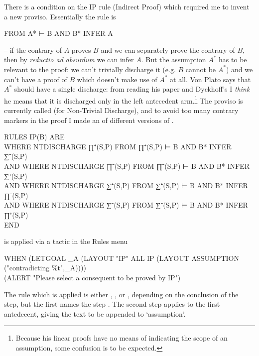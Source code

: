 There is a condition on the IP rule (Indirect Proof) which required me to invent a new proviso. Essentially the rule is
\begin{japeish}
FROM A* ⊢ B AND B* INFER A
\end{japeish}
-- if the contrary of $A$ proves $B$ and we can separately prove the contrary of $B$, then by \emph{reductio ad absurdum} we can infer $A$. But the assumption $A^{*}$ has to be relevant to the proof: we can't trivially discharge it (e.g. $B$ cannot be $A^{*}$) and we can't have a proof of $B$ which doesn't make use of $A^{*}$ at all. Von Plato says that $A^{*}$ should have a single discharge: from reading his paper and Dyckhoff's I \emph{think} he means that it is discharged only in the left antecedent arm.\footnote{Because his linear proofs have no means of indicating the scope of an assumption, some confusion is to be expected.} The proviso is currently called  (for Non-Trivial Discharge), and to avoid too many contrary markers in the proof I made an  of different versions of .
\begin{japeish}
RULES IP(B) ARE \\
\tab\tab WHERE NTDISCHARGE ∏⁺(S,P) FROM ∏⁺(S,P) ⊢ B AND B* INFER ∑⁻(S,P) \\ 
 AND WHERE NTDISCHARGE ∏⁻(S,P) FROM ∏⁻(S,P) ⊢ B AND B* INFER ∑⁺(S,P)  \\
 AND WHERE NTDISCHARGE ∑⁺(S,P) FROM ∑⁺(S,P) ⊢ B AND B* INFER ∏⁻(S,P)  \\
 AND WHERE NTDISCHARGE ∑⁻(S,P) FROM ∑⁻(S,P) ⊢ B AND B* INFER ∏⁺(S,P) \\
END
\end{japeish}
 is applied via a tactic in the Rules menu
\begin{japeish}
WHEN (LETGOAL \_A (LAYOUT "IP" ALL IP (LAYOUT ASSUMPTION ("contradicting \%t",\_A)))) \\
\tab\tab\tab                  (ALERT "Please select a consequent to be proved by IP") \\
\end{japeish}
The rule which is applied is either , ,  or , depending on the conclusion of the step, but the first  names the step . The second step applies  to the first antedecent, giving the text to be appended to `assumption'.

